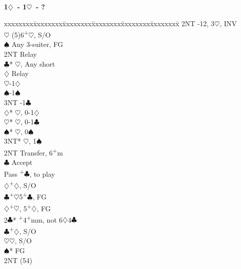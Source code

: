 \documentclass[10pt]{article}
\renewcommand{\c}{$\clubsuit$}
\renewcommand{\d}{$\diamondsuit$}
\newcommand{\h}{$\heartsuit$}
\newcommand{\s}{$\spadesuit$}
\newcommand{\p}{\textsuperscript{+}}
\newenvironment{bidtable}[1][]
{\textbf{#1}
  \begin{adjustwidth}{1em}{}
    \addvspace{2pt}
    \begin{tabbing}
      xxxxxxxx\=xxxxxxxx\=xxxxxxxx\=xxxxxxxx\=xxxxxxxx\=xxxxxxxx\=\kill}
{\end{tabbing}\end{adjustwidth}\bigskip}%
\begin{document}
\begin{multicols*}{2}
\begin{bidtable}[1\d\ - 1\h\ - ?]
                \>      \> 2NT      -12, 3\h, INV             \\
                \h  \> (5)6\p\h, S/O                           \\
                \s  \> Any 3-suiter, FG                        \\
                \>      \> 2NT      \> Relay                       \\
                \>      \>          \c* {}\h, Any short      \\
                \>      \>          \>      \d \> Relay        \\
                \>      \>          \>      \>     \h {}-1\d \\
                \>      \>          \>      \>     \s {}-1\s \\
                \>      \>          \>      \>     \> 3NT -1\c \\
                \>      \>          \d* {}\h, 0-1\d          \\
                \>      \>          \h* {}\h, 0-1\c          \\
                \>      \>          \s* {}\h, 0\s            \\
                \>      \>          \> 3NT* \h, 1\s            \\
                \> 2NT  \> Transfer, 6\p m                         \\
                \>      \c      \> Accept                      \\
                \>      \>          \> Pass \p\c, to play      \\
                \>      \>          \d  {}\p\d, S/O          \\
                \c  {}\p\h 5\p\c, FG                         \\
                \d  {}\p\h, 5\p\d, FG                        \\
2\c*            {}\p 4\p mm, not 6\d 4\c                         \\
                \c  {}\p\d, S/O                              \\
                \h  {}\h, S/O                                \\
                \s* \> FG                                      \\
                \>      \> 2NT      (54)                      \\

\end{bidtable}
\end{multicols*}
\end{document}
